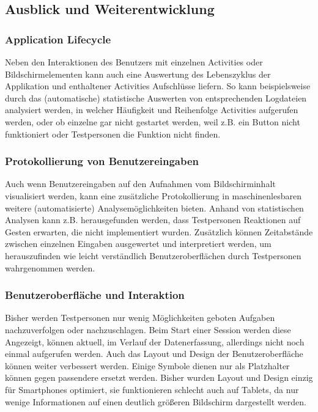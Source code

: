  
\subsection{Ausblick und Weiterentwicklung}
\label{sec:client_offene_punkte}
\subsubsection{Application Lifecycle}
Neben den Interaktionen des Benutzers mit einzelnen Activities oder Bildschirmelementen kann auch eine Auswertung des Lebenszyklus der Applikation und enthaltener Activities Aufschlüsse liefern.
So kann beispielsweise durch das (automatische) statistische Auswerten von entsprechenden Logdateien analysiert werden, in welcher Häufigkeit und Reihenfolge Activities aufgerufen werden, oder ob einzelne gar nicht gestartet werden, weil z.B. ein Button nicht funktioniert oder Testpersonen die Funktion nicht finden.

\subsubsection{Protokollierung von Benutzereingaben}
Auch wenn Benutzereingaben auf den Aufnahmen vom Bildschirminhalt visualisiert werden, kann eine zusätzliche Protokollierung in maschinenlesbaren weitere (automatisierte) Analysemöglichkeiten bieten.
Anhand von statistischen Analysen kann z.B. herausgefunden werden, dass Testpersonen Reaktionen auf Gesten erwarten, die nicht implementiert wurden.
Zusätzlich können Zeitabstände zwischen einzelnen Eingaben ausgewertet und interpretiert werden, um herauszufinden wie leicht verständlich Benutzeroberflächen durch Testpersonen wahrgenommen werden.

\subsubsection{Benutzeroberfläche und Interaktion}
Bisher werden Testpersonen nur wenig Möglichkeiten geboten Aufgaben nachzuverfolgen oder nachzuschlagen.
Beim Start einer Session werden diese Angezeigt, können aktuell, im Verlauf der Datenerfassung, allerdings nicht noch einmal aufgerufen werden.
Auch das Layout und Design der Benutzeroberfläche können weiter verbessert werden.
Einige Symbole dienen nur als Platzhalter können gegen passendere ersetzt werden.
Bisher wurden Layout und Design einzig für Smartphones optimiert, sie funktionieren schlecht auch auf Tablets, da nur wenige Informationen auf einen deutlich größeren Bildschirm dargestellt werden.


